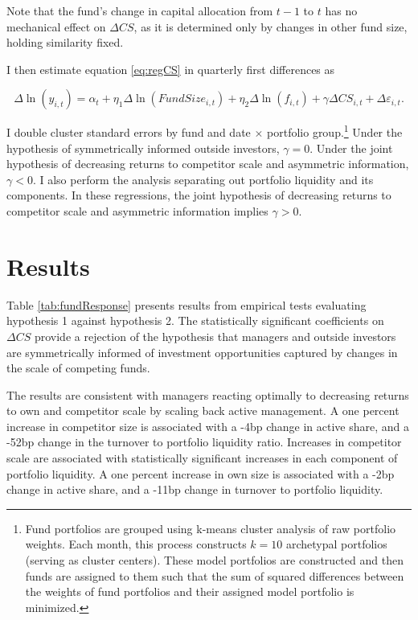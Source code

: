 \documentclass[openany]{book}
\let\rmarkdownfootnote\footnote%
\def\footnote{\protect\rmarkdownfootnote}
\theoremstyle{definition}
\theoremstyle{definition}
\theoremstyle{definition}
\theoremstyle{remark}
\begin{document}
Note that the fund's change in capital allocation from \(t-1\) to \(t\)
has no mechanical effect on \(\Delta CS\), as it is determined only by
changes in other fund size, holding similarity fixed.

I then estimate equation \eqref{eq:regCS} in quarterly first differences
as

\begin{equation}
\Delta\ln(y_{i,t})=\alpha_t + \eta_1 \Delta\ln(FundSize_{i,t}) +\eta_2 \Delta\ln(f_{i,t}) + \gamma\Delta CS_{i,t} + \Delta\varepsilon_{i,t}.
\label{eq:fdReg}
\end{equation}

I double cluster standard errors by fund and date \(\times\) portfolio
group.\footnote{
Fund portfolios are grouped using k-means cluster analysis of raw portfolio weights. Each month, this process constructs $k=10$ archetypal portfolios (serving as cluster centers). These model portfolios are constructed and then funds are assigned to them such that the sum of squared differences between the weights of fund portfolios and their assigned model portfolio is minimized.
} Under the hypothesis of symmetrically informed outside investors,
\(\gamma=0\). Under the joint hypothesis of decreasing returns to
competitor scale and asymmetric information, \(\gamma<0\). I also
perform the analysis separating out portfolio liquidity and its
components. In these regressions, the joint hypothesis of decreasing
returns to competitor scale and asymmetric information implies
\(\gamma>0\).

\section{Results}\label{results}

Table \ref{tab:fundResponse} presents results from empirical tests
evaluating hypothesis 1 against hypothesis 2. The statistically
significant coefficients on \(\Delta CS\) provide a rejection of the
hypothesis that managers and outside investors are symmetrically
informed of investment opportunities captured by changes in the scale of
competing funds.

The results are consistent with managers reacting optimally to
decreasing returns to own and competitor scale by scaling back active
management. A one percent increase in competitor size is associated with
a -4bp change in active share, and a -52bp change in the turnover to
portfolio liquidity ratio. Increases in competitor scale are associated
with statistically significant increases in each component of portfolio
liquidity. A one percent increase in own size is associated with a -2bp
change in active share, and a -11bp change in turnover to portfolio
liquidity.
\end{document}
